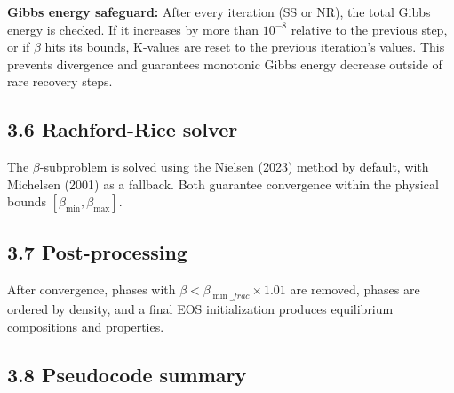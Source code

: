 \documentclass[review,3p]{custom}
\begin{document}
\textbf{Gibbs energy safeguard:} After every iteration (SS or NR), the total Gibbs energy
is checked. If it increases by more than $10^{-8}$ relative to the previous step, or
if $\beta$ hits its bounds, K-values are reset to the previous iteration's values.
This prevents divergence and guarantees monotonic Gibbs energy decrease outside of
rare recovery steps.

\subsection{3.6 Rachford-Rice solver}

The $\beta$-subproblem is solved using the Nielsen (2023) method by default,
with Michelsen (2001) as a fallback. Both guarantee convergence within the physical
bounds $[\beta_{\min}, \beta_{\max}]$.

\subsection{3.7 Post-processing}

After convergence, phases with $\beta < \beta_{\min\_frac} \times 1.01$ are removed,
phases are ordered by density, and a final EOS initialization produces equilibrium
compositions and properties.

\subsection{3.8 Pseudocode summary}
\end{document}

